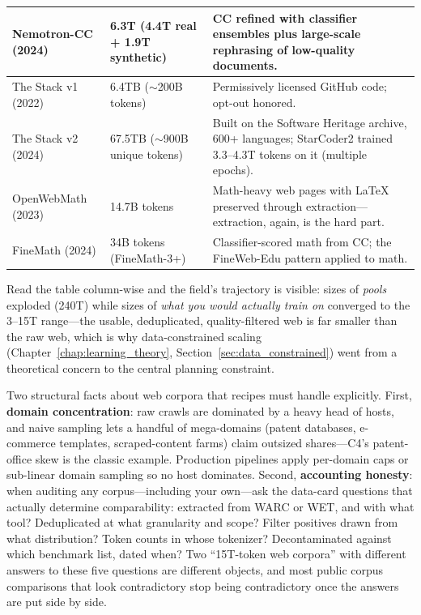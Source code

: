 \begin{table}[H]
\begin{tabularx}{\textwidth}{llX}
Nemotron-CC (2024) & 6.3T (4.4T real + 1.9T synthetic) & CC refined with classifier ensembles plus large-scale rephrasing of low-quality documents. \\
\midrule
The Stack v1 (2022) & 6.4TB ($\sim$200B tokens) & Permissively licensed GitHub code; opt-out honored. \\
The Stack v2 (2024) & 67.5TB ($\sim$900B unique tokens) & Built on the Software Heritage archive, 600+ languages; StarCoder2 trained 3.3--4.3T tokens on it (multiple epochs). \\
\midrule
OpenWebMath (2023) & 14.7B tokens & Math-heavy web pages with LaTeX preserved through extraction---extraction, again, is the hard part. \\
FineMath (2024) & 34B tokens (FineMath-3+) & Classifier-scored math from CC; the FineWeb-Edu pattern applied to math. \\
\bottomrule
\end{tabularx}
\end{table}

Read the table column-wise and the field's trajectory is visible: sizes of \textit{pools} exploded (240T) while sizes of \textit{what you would actually train on} converged to the 3--15T range---the usable, deduplicated, quality-filtered web is far smaller than the raw web, which is why data-constrained scaling (Chapter~\ref{chap:learning_theory}, Section~\ref{sec:data_constrained}) went from a theoretical concern to the central planning constraint.

Two structural facts about web corpora that recipes must handle explicitly. First, \textbf{domain concentration}: raw crawls are dominated by a heavy head of hosts, and naive sampling lets a handful of mega-domains (patent databases, e-commerce templates, scraped-content farms) claim outsized shares---C4's patent-office skew is the classic example. Production pipelines apply per-domain caps or sub-linear domain sampling so no host dominates. Second, \textbf{accounting honesty}: when auditing any corpus---including your own---ask the data-card questions that actually determine comparability: extracted from WARC or WET, and with what tool? Deduplicated at what granularity and scope? Filter positives drawn from what distribution? Token counts in whose tokenizer? Decontaminated against which benchmark list, dated when? Two ``15T-token web corpora'' with different answers to these five questions are different objects, and most public corpus comparisons that look contradictory stop being contradictory once the answers are put side by side.

